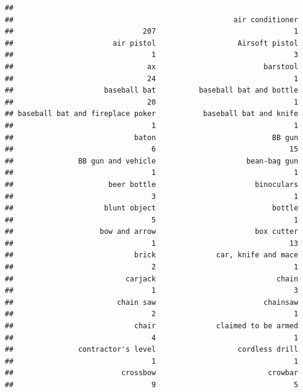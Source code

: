\documentclass[
]{article}
\newenvironment{Shaded}{\begin{snugshade}}{\end{snugshade}}
\newcommand{\FunctionTok}[1]{\textcolor[rgb]{0.00,0.00,0.00}{#1}}
\newcommand{\NormalTok}[1]{#1}
\newcommand{\SpecialCharTok}[1]{\textcolor[rgb]{0.00,0.00,0.00}{#1}}
\begin{document}
\begin{Shaded}
\end{Shaded}

\begin{verbatim}
## 
##                                                   air conditioner 
##                              207                                1 
##                       air pistol                   Airsoft pistol 
##                                1                                3 
##                               ax                         barstool 
##                               24                                1 
##                     baseball bat          baseball bat and bottle 
##                               20                                1 
## baseball bat and fireplace poker           baseball bat and knife 
##                                1                                1 
##                            baton                           BB gun 
##                                6                               15 
##               BB gun and vehicle                     bean-bag gun 
##                                1                                1 
##                      beer bottle                       binoculars 
##                                3                                1 
##                     blunt object                           bottle 
##                                5                                1 
##                    bow and arrow                       box cutter 
##                                1                               13 
##                            brick              car, knife and mace 
##                                2                                1 
##                          carjack                            chain 
##                                1                                3 
##                        chain saw                         chainsaw 
##                                2                                1 
##                            chair              claimed to be armed 
##                                4                                1 
##               contractor's level                   cordless drill 
##                                1                                1 
##                         crossbow                          crowbar 
##                                9                                5 

\end{verbatim}
\end{document}
